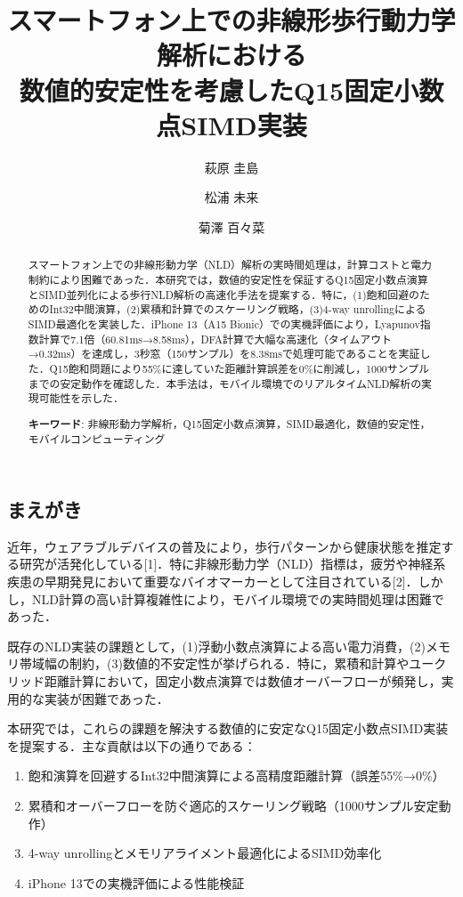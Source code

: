 \documentclass[10pt,twocolumn]{article}
\title{\Large\bfseries スマートフォン上での非線形歩行動力学解析における\\数値的安定性を考慮したQ15固定小数点SIMD実装}
\author[1]{萩原 圭島}
\author[1]{松浦 未来}
\author[1]{菊澤 百々菜}
\affil[1]{中部大学大学院工学研究科情報工学専攻}
\date{}
\begin{document}
\begin{CJK}{UTF8}{min}

\maketitle

\begin{abstract}
スマートフォン上での非線形動力学（NLD）解析の実時間処理は，計算コストと電力制約により困難であった．本研究では，数値的安定性を保証するQ15固定小数点演算とSIMD並列化による歩行NLD解析の高速化手法を提案する．特に，(1)飽和回避のためのInt32中間演算，(2)累積和計算でのスケーリング戦略，(3)4-way unrollingによるSIMD最適化を実装した．iPhone 13（A15 Bionic）での実機評価により，Lyapunov指数計算で7.1倍（60.81ms→8.58ms），DFA計算で大幅な高速化（タイムアウト→0.32ms）を達成し，3秒窓（150サンプル）を8.38msで処理可能であることを実証した．Q15飽和問題により55\%に達していた距離計算誤差を0\%に削減し，1000サンプルまでの安定動作を確認した．本手法は，モバイル環境でのリアルタイムNLD解析の実現可能性を示した．

\textbf{キーワード}: 非線形動力学解析，Q15固定小数点演算，SIMD最適化，数値的安定性，モバイルコンピューティング
\end{abstract}

\section{まえがき}

近年，ウェアラブルデバイスの普及により，歩行パターンから健康状態を推定する研究が活発化している[1]．特に非線形動力学（NLD）指標は，疲労や神経系疾患の早期発見において重要なバイオマーカーとして注目されている[2]．しかし，NLD計算の高い計算複雑性により，モバイル環境での実時間処理は困難であった．

既存のNLD実装の課題として，(1)浮動小数点演算による高い電力消費，(2)メモリ帯域幅の制約，(3)数値的不安定性が挙げられる．特に，累積和計算やユークリッド距離計算において，固定小数点演算では数値オーバーフローが頻発し，実用的な実装が困難であった．

本研究では，これらの課題を解決する数値的に安定なQ15固定小数点SIMD実装を提案する．主な貢献は以下の通りである：

\begin{enumerate}
\item 飽和演算を回避するInt32中間演算による高精度距離計算（誤差55\%→0\%）
\item 累積和オーバーフローを防ぐ適応的スケーリング戦略（1000サンプル安定動作）
\item 4-way unrollingとメモリアライメント最適化によるSIMD効率化
\item iPhone 13での実機評価による性能検証
\end{enumerate}


\end{CJK}
\end{document}
